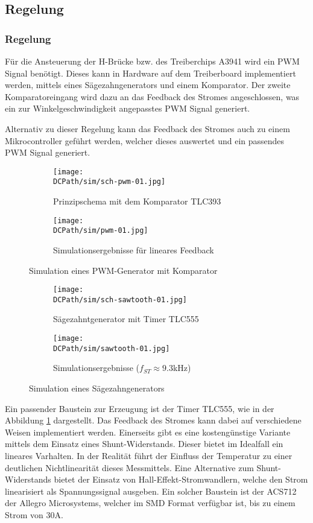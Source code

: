 \ifSTANDALONE
\subsection{Regelung}
\fi
\ifEMBED
\subsubsection{Regelung}
\fi
Für die Ansteuerung der H-Brücke bzw. des Treiberchips A3941 wird ein PWM
Signal benötigt. Dieses kann in Hardware auf dem Treiberboard implementiert
werden, mittels eines Sägezahngenerators und einem Komparator. Der zweite
Komparatoreingang wird dazu an das Feedback des Stromes angeschlossen, was
ein zur Winkelgeschwindigkeit angepasstes PWM Signal generiert.

\noindent Alternativ zu dieser Regelung kann das Feedback des Stromes auch zu 
einem Mikrocontroller geführt werden, welcher dieses auswertet und ein passendes
PWM Signal generiert.

\begin{figure}[h!]
    \centering
    \begin{subfigure}[b]{0.45\textwidth}
        \texttt{[image: \\DCPath/sim/sch-pwm-01.jpg]}
        \caption{Prinzipschema mit dem Komparator TLC393}
    \end{subfigure}
    \begin{subfigure}[b]{0.45\textwidth}
        \texttt{[image: \\DCPath/sim/pwm-01.jpg]}
        \caption{Simulationsergebnisse für lineares Feedback}
    \end{subfigure}
    \caption{Simulation eines PWM-Generator mit Komparator}
\end{figure}

\begin{figure}[h!]
    \centering
    \begin{subfigure}[b]{0.45\textwidth}
        \texttt{[image: \\DCPath/sim/sch-sawtooth-01.jpg]}
        \caption{Sägezahntgenerator mit Timer TLC555}
    \end{subfigure}
    \begin{subfigure}[b]{0.45\textwidth}
        \texttt{[image: \\DCPath/sim/sawtooth-01.jpg]}
        \caption{Simulationsergebnisse ($f_{ST} \approx 9.3$kHz)}
    \end{subfigure}
    \caption{Simulation eines Sägezahngenerators}
    \label{fig:sawtooth}
\end{figure}

\noindent Ein passender Baustein zur Erzeugung ist der Timer TLC555, wie in der
Abbildung \ref{fig:sawtooth} dargestellt. Das Feedback des Stromes kann
dabei auf verschiedene Weisen implementiert werden. Einerseits gibt es eine
kostengünstige Variante mittels dem Einsatz eines Shunt-Widerstands. Dieser
bietet im Idealfall ein lineares Varhalten. In der Realität führt der
Einfluss der Temperatur zu einer deutlichen Nichtlinearität dieses
Messmittels. Eine Alternative zum Shunt-Widerstands bietet der Einsatz von
Hall-Effekt-Stromwandlern, welche den Strom linearisiert als Spannungssignal
ausgeben. Ein solcher Baustein ist der ACS712 der Allegro Microsystems,
welcher im SMD Format verfügbar ist, bis zu einem Strom von 30\si{\ampere}.


